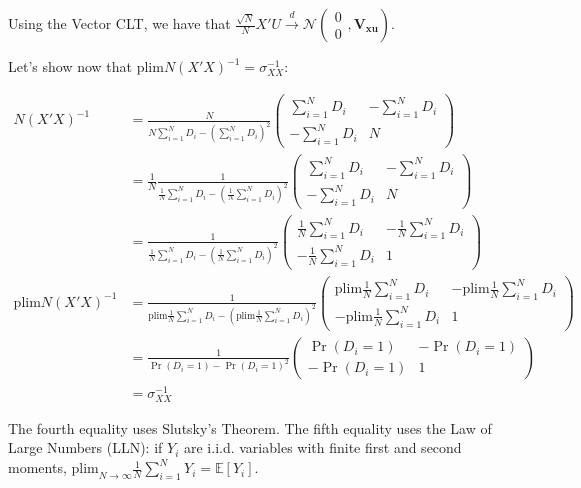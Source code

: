 \documentclass[]{book}
\newcommand{\esp}[1]{\mathbb{E}[ #1 ]}
\newcommand{\plim}[1]{\text{plim}_{ #1 \rightarrow \infty}}
\newcommand{\plims}{\text{plim}}
\theoremstyle{definition}
\theoremstyle{definition}
\theoremstyle{definition}
\theoremstyle{remark}
\begin{document}
Using the Vector CLT, we have that \(\frac{\sqrt{N}}{N}X'U\stackrel{d}{\rightarrow}\mathcal{N}\left(\begin{array}{c} 0\\ 0\end{array},\mathbf{V_{xu}}\right)\).

Let's show now that \(\plims N(X'X)^{-1}=\sigma_{XX}^{-1}\):

\begin{align*}
N(X'X)^{-1} & = \frac{N}{N\sum_{i=1}^ND_i-\left(\sum_{i=1}^ND_i\right)^2}
                \left(\begin{array}{cc} \sum_{i=1}^ND_i & -\sum_{i=1}^ND_i \\ -\sum_{i=1}^ND_i & N \end{array}\right) \\
            & = \frac{1}{N}\frac{1}{\frac{1}{N}\sum_{i=1}^ND_i-\left(\frac{1}{N}\sum_{i=1}^ND_i\right)^2}
                \left(\begin{array}{cc} \sum_{i=1}^ND_i & -\sum_{i=1}^ND_i \\ -\sum_{i=1}^ND_i & N \end{array}\right)\\
            & = \frac{1}{\frac{1}{N}\sum_{i=1}^ND_i-\left(\frac{1}{N}\sum_{i=1}^ND_i\right)^2}
                \left(\begin{array}{cc} \frac{1}{N}\sum_{i=1}^ND_i & -\frac{1}{N}\sum_{i=1}^ND_i \\ -\frac{1}{N}\sum_{i=1}^ND_i & 1 \end{array}\right)\\
\plims N(X'X)^{-1} & = \frac{1}{\plims\frac{1}{N}\sum_{i=1}^ND_i-\left(\plims\frac{1}{N}\sum_{i=1}^ND_i\right)^2}
                \left(\begin{array}{cc} \plims\frac{1}{N}\sum_{i=1}^ND_i & -\plims\frac{1}{N}\sum_{i=1}^ND_i \\ -\plims\frac{1}{N}\sum_{i=1}^ND_i & 1 \end{array}\right)\\
                  & = \frac{1}{\Pr(D_i=1)-\Pr(D_i=1)^2}
                \left(\begin{array}{cc} \Pr(D_i=1) & -\Pr(D_i=1) \\ -\Pr(D_i=1) & 1 \end{array}\right)\\
                 & = \sigma_{XX}^{-1}
\end{align*}

The fourth equality uses Slutsky's Theorem.
The fifth equality uses the Law of Large Numbers (LLN): if \(Y_i\) are i.i.d. variables with finite first and second moments, \(\plim{N}\frac{1}{N}\sum_{i=1}^NY_i = \esp{Y_i}\).
\end{document}
